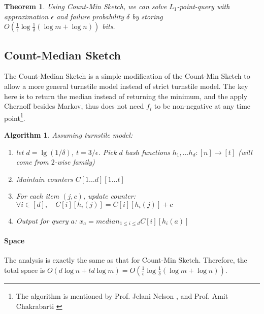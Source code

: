 \documentclass[11pt]{article}
\theoremstyle{plain}
\newtheorem{theorem}{Theorem}[section]
\newtheorem{algorithm}{Algorithm}[section]
\begin{document}
\begin{theorem}
Using Count-Min Sketch, we can solve $L_1$-point-query with approximation 
$\epsilon$ and failure probability $\delta$ by storing $O(\frac{1}{\epsilon}\log 
\frac{1}{\delta}(\log m 
+\log n))$ bits.
\end{theorem}


\subsection{Count-Median Sketch}
The Count-Median Sketch is a simple modification of the Count-Min Sketch to 
allow a more general turnstile model instead of strict turnstile model. The key 
here is to return the median instead of returning the minimum, and the apply 
Chernoff besides Markov, thus does not need $f_i$ to be non-negative at any 
time point\footnote{The algorithm is mentioned by 
	Prof. Jelani Nelson  \cite{Nel2015-web}, and Prof. Amit 
	Chakrabarti  \cite{Cha2015-notes}}. 

\begin{algorithm}
	\label{al:countmedian}
	Assuming turnstile model:
	\begin{enumerate}
		\item let $d = \lg(1/\delta)$, $t=3/\epsilon$. Pick $d$ hash functions 
		$h_1,...h_d: [n]\rightarrow[t]$ (will come from $2$-wise family)
		\item Maintain counters $C[1\dots d][1\dots t]$
		\item For each item $(j,c)$, update counter: $\forall i\in [d], \quad 
		C[i][h_i(j)]=C[i][h_i(j)]+c$
		\item Output for query $a$: $x_a=median_{1\leq i \leq d}C[i][h_i(a)]$
	\end{enumerate}
\end{algorithm}

\paragraph{Space}
The analysis is exactly the same as that for Count-Min Sketch. Therefore, the 
total space is $O(d\log n + td \log m)=O(\frac{1}{\epsilon}\log 
\frac{1}{\delta}(\log m +\log n))$. 
\end{document}
